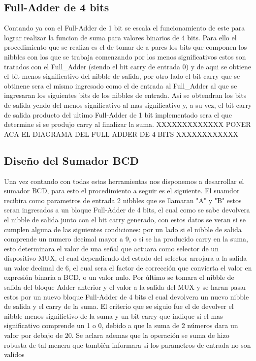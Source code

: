   \subsection{Full-Adder de 4 bits}
  Contando ya con el Full-Adder de 1 bit se escala el funcionamiento de este para lograr realizar la funcion de suma para valores binarios de 4 bits. Para ello el procedimiento que se realiza es el de tomar de a pares los bits que componen los nibbles con los que se trabaja comenzando por los menos significativos estos son tratados con el Full_Adder (siendo el bit carry de entrada 0) y de aqui se obtiene el bit menos significativo del nibble de salida, por otro lado el bit carry que se obtinene sera el mismo ingresado como el de entrada al Full_Adder al que se ingresaran los siguientes bits de los nibbles de entrada. Asi se obtendran los bits de salida yendo del menos significativo al mas significativo y, a su vez, el bit carry de salida producto del ultimo Full-Adder de 1 bit implementado sera el que determine si se produjo carry al finalizar la suma.
  XXXXXXXXXXXXX PONER ACA EL DIAGRAMA DEL FULL ADDER DE 4 BITS XXXXXXXXXXXX
  \subsection{Diseño del Sumador BCD}
  Una vez contando con todas estas herramientas nos disponemos a desarrollar el sumador BCD, para esto el procedimiento a seguir es el siguiente. El suamdor recibira como parametros de entrada 2 nibbles que se llamaran "A" y "B" estos seran ingresados a un bloque Full-Adder de 4 bits, el cual como se sabe devolvera el nibble de salida junto con el bit carry generado, con estos datos se veran si se cumplen alguna de las siguientes condiciones: por un lado si el nibble de salida comprende un numero decimal mayor a 9, o si se ha producido carry en la suma, esto determinara el valor de una señal que actuara como selector de un dispositivo MUX, el cual dependiendo del estado del selector arrojara a la salida un valor decimal de 6, el cual sera el factor de corrección que convierta el valor en expresión binaria a BCD,  o un valor nulo. Por último se tomara el nibble de salida del bloque Adder anterior y el valor a la salida del MUX y se haran pasar estos por un nuevo bloque Full-Adder de 4 bits el cual devolvera un nuevo nibble de salida y el carry de la suma. El criterio que se siguio fue el de devolver el nibble menos significtivo de la suma y un bit carry que indique si el mas significativo comprende un 1 o 0, debido a que la suma de 2 números dara un valor por debajo de 20. Se aclara ademas que la operación se suma de hizo robusta de tal menera que también informara si los parametros de entrada no son validos